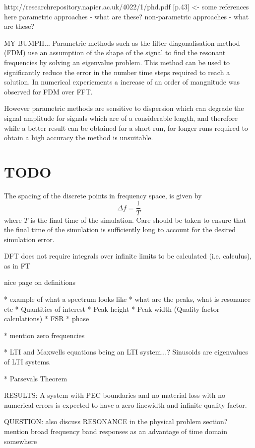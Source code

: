 http://researchrepository.napier.ac.uk/4022/1/phd.pdf [p.43] <- some references
here parametric approaches - what are these? non-parametric approaches - what
are these?

MY BUMPH...
Parametric methods such as the filter diagonalisation method (FDM) use an
assumption of the shape of the signal to find the resonant frequencies by
solving an eigenvalue problem. This method can be used to significantly reduce
the error in the number time steps required to reach a solution. In numerical
experiements a increase of an order of mangnitude was observed for FDM over FFT.

However parametric methods are sensitive to dispersion which can degrade the
signal amplitude for signals which are of a considerable length, and therefore
while a better result can be obtained for a short run, for longer runs required
to obtain a high accuracy the method is unsuitable.
\section{TODO}
The spacing of the discrete points in frequency space, is given by
$$
\Delta f = \frac{1}{T}
$$
where $T$ is the final time of the simulation. Care should be taken to ensure
that the final time of the simulation is sufficiently long to account for the
desired simulation error.

DFT does not require integrals over infinite limits to be calculated (i.e. calculus), as in FT

nice page on definitions

* example of what a spectrum looks like * what are the peaks, what is resonance
etc * Quantities of interest * Peak height * Peak width (Quality factor
calculations) * FSR * phase

* mention zero frequencies

* LTI and Maxwells equations being an LTI system...? Sinusoids are eigenvalues of LTI systems.

* Parsevals Theorem

RESULTS: A system with PEC boundaries and no material loss with no numerical errors is expected to have a zero linewidth and infinite quality factor.

QUESTION: also discuss RESONANCE in the physical problem section?
mention broad frequency band responses as an advantage of time domain somewhere

